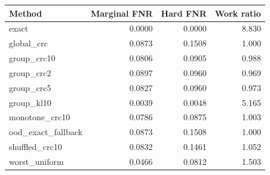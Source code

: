 \begin{tabular}{lrrr}
\hline
Method & Marginal FNR & Hard FNR & Work ratio \\
\hline
exact & 0.0000 & 0.0000 & 8.830 \\
global\_crc & 0.0873 & 0.1508 & 1.000 \\
group\_crc10 & 0.0806 & 0.0905 & 0.988 \\
group\_crc2 & 0.0897 & 0.0960 & 0.969 \\
group\_crc5 & 0.0827 & 0.0960 & 0.973 \\
group\_kl10 & 0.0039 & 0.0048 & 5.165 \\
monotone\_crc10 & 0.0786 & 0.0875 & 1.003 \\
ood\_exact\_fallback & 0.0873 & 0.1508 & 1.000 \\
shuffled\_crc10 & 0.0832 & 0.1461 & 1.052 \\
worst\_uniform & 0.0466 & 0.0812 & 1.503 \\
\hline
\end{tabular}
